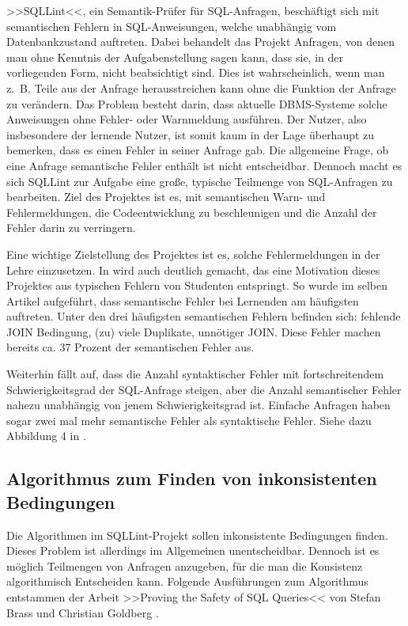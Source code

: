 >>SQLLint<<, ein Semantik-Prüfer für SQL-Anfragen, beschäftigt sich mit semantischen Fehlern in SQL-Anweisungen, welche unabhängig vom Datenbankzustand auftreten. Dabei behandelt das Projekt Anfragen, von denen man ohne Kenntnis der Aufgabenstellung sagen kann, dass sie, in der vorliegenden Form, nicht beabsichtigt sind. Dies ist wahrscheinlich, wenn man \mbox{z. B.} Teile aus der Anfrage herausstreichen kann ohne die Funktion der Anfrage zu verändern.  Das Problem besteht darin, dass aktuelle DBMS-Systeme solche Anweisungen ohne Fehler- oder Warnmeldung ausführen. Der Nutzer, also insbesondere der lernende Nutzer, ist somit kaum in der Lage überhaupt zu bemerken, dass es einen Fehler in seiner Anfrage gab. Die allgemeine Frage, ob eine Anfrage semantische Fehler enthält ist nicht entscheidbar. Dennoch macht es sich SQLLint zur Aufgabe eine große, typische Teilmenge von SQL-Anfragen zu bearbeiten. Ziel des Projektes ist es, mit semantischen Warn- und Fehlermeldungen, die Codeentwicklung zu beschleunigen und die Anzahl der Fehler darin zu verringern.

Eine wichtige Zielstellung des Projektes ist es, solche Fehlermeldungen in der Lehre einzusetzen. In \cite{sqllint1} wird auch deutlich gemacht, das eine Motivation dieses Projektes aus typischen Fehlern von Studenten entspringt. So wurde im selben Artikel aufgeführt, dass semantische Fehler bei Lernenden am häufigsten auftreten. Unter den drei häufigsten semantischen Fehlern befinden sich: fehlende JOIN Bedingung, (zu) viele Duplikate, unnötiger JOIN. Diese Fehler machen bereits ca. 37 Prozent der semantischen Fehler aus.

Weiterhin fällt auf, dass die Anzahl syntaktischer Fehler mit fortschreitendem Schwierigkeitsgrad der SQL-Anfrage steigen, aber die Anzahl semantischer Fehler nahezu unabhängig von jenem Schwierigkeitsgrad ist. Einfache Anfragen haben sogar zwei mal mehr semantische Fehler als syntaktische Fehler. Siehe dazu Abbildung 4 in \cite{sqllint1}.

\subsection{Algorithmus zum Finden von inkonsistenten Bedingungen}

Die Algorithmen im SQLLint-Projekt sollen inkonsistente Bedingungen finden. Dieses Problem ist allerdings im Allgemeinen unentscheidbar. Dennoch ist es möglich Teilmengen von Anfragen anzugeben, für die man die Konsistenz algorithmisch Entscheiden kann. Folgende Ausführungen zum Algorithmus entstammen der Arbeit >>Proving the Safety of SQL Queries<< von Stefan Brass und Christian Goldberg \cite{brass1}.

